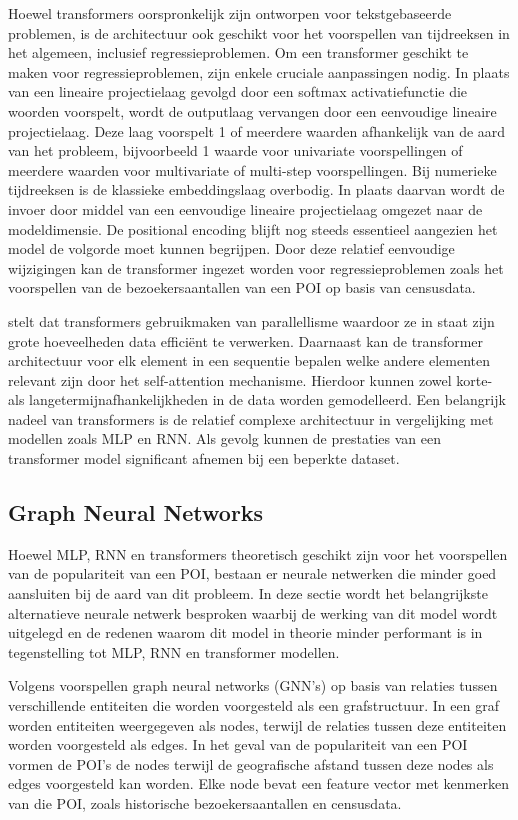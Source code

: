 Hoewel transformers oorspronkelijk zijn ontworpen voor tekstgebaseerde problemen, is de architectuur ook geschikt voor het voorspellen van tijdreeksen in het algemeen, inclusief regressieproblemen. Om een transformer geschikt te maken voor regressieproblemen, zijn enkele cruciale aanpassingen nodig. In plaats van een lineaire projectielaag gevolgd door een softmax activatiefunctie die woorden voorspelt, wordt de outputlaag vervangen door een eenvoudige lineaire projectielaag. Deze laag voorspelt 1 of meerdere waarden afhankelijk van de aard van het probleem, bijvoorbeeld 1 waarde voor univariate voorspellingen of meerdere waarden voor multivariate of multi-step voorspellingen. Bij numerieke tijdreeksen is de klassieke embeddingslaag overbodig. In plaats daarvan wordt de invoer door middel van een eenvoudige lineaire projectielaag omgezet naar de modeldimensie. De positional encoding blijft nog steeds essentieel aangezien het model de volgorde moet kunnen begrijpen. Door deze relatief eenvoudige wijzigingen kan de transformer ingezet worden voor regressieproblemen zoals het voorspellen van de bezoekersaantallen van een POI op basis van censusdata.

\textcite{Islam2023} stelt dat transformers gebruikmaken van parallellisme waardoor ze in staat zijn grote hoeveelheden data efficiënt te verwerken. Daarnaast kan de transformer architectuur voor elk element in een sequentie bepalen welke andere elementen relevant zijn door het self-attention mechanisme. Hierdoor kunnen zowel korte- als langetermijnafhankelijkheden in de data worden gemodelleerd. Een belangrijk nadeel van transformers is de relatief complexe architectuur in vergelijking met modellen zoals MLP en RNN. Als gevolg kunnen de prestaties van een transformer model significant afnemen bij een beperkte dataset.

\subsection{Graph Neural Networks}
Hoewel MLP, RNN en transformers theoretisch geschikt zijn voor het voorspellen van de populariteit van een POI, bestaan er neurale netwerken die minder goed aansluiten bij de aard van dit probleem. In deze sectie wordt het belangrijkste alternatieve neurale netwerk besproken waarbij de werking van dit model wordt uitgelegd en de redenen waarom dit model in theorie minder performant is in tegenstelling tot MLP, RNN en transformer modellen.

Volgens \textcite{Zhou2018} voorspellen graph neural networks (GNN’s) op basis van relaties tussen verschillende entiteiten die worden voorgesteld als een grafstructuur. In een graf worden entiteiten weergegeven als nodes, terwijl de relaties tussen deze entiteiten worden voorgesteld als edges. In het geval van de populariteit van een POI vormen de POI’s de nodes terwijl de geografische afstand tussen deze nodes als edges voorgesteld kan worden. Elke node bevat een feature vector met kenmerken van die POI, zoals historische bezoekersaantallen en censusdata.


